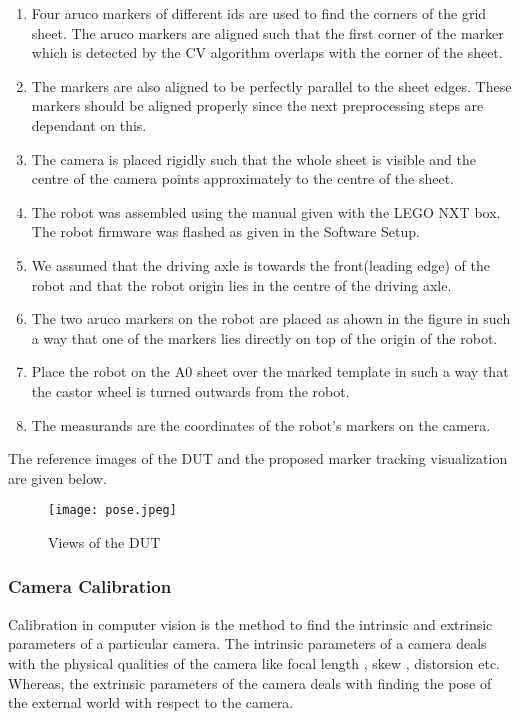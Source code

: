 \documentclass[10pt,a4paper]{article}
\begin{document}
\begin{enumerate}
	\item
	Four aruco markers of different ids are used to find the corners of the grid sheet. The aruco markers are aligned such that the first corner of the marker which is detected by the CV algorithm overlaps with the corner of the sheet.
	\item
	The markers are also aligned to be perfectly parallel to the sheet edges. These markers should be aligned properly since the next preprocessing steps are dependant on this.
	\item
	The camera is placed rigidly such that the whole sheet is visible and the centre of the camera points approximately to the centre of the sheet.	
    \item
    The robot was assembled using the manual given with the LEGO NXT box. The robot firmware was flashed as given in the Software Setup. 
    \item
    We assumed that the driving axle is towards the front(leading edge) of the robot and that the robot origin lies in the centre of the driving axle.
    \item
    The two aruco markers on the robot are placed as ahown in the figure in such a way that one of the markers lies directly on top of the origin of the robot.
    \item
    Place the robot on the A0 sheet over the marked template in such a way that the castor wheel is turned outwards from the robot.
    \item
	The measurands are the coordinates of the robot's markers on the camera.
    
\end{enumerate}
\vspace{0.5cm}

The reference images of the DUT and the proposed marker tracking visualization are given below.

\begin{figure}[h]
	\centering
\texttt{[image: pose.jpeg]}
\caption{ Views of the DUT}
\end{figure}

\subsubsection{Camera Calibration}


Calibration in computer vision is the method to find the intrinsic and extrinsic parameters of a particular camera. The intrinsic parameters of a camera deals with the physical qualities of the camera like focal length , skew , distorsion etc. Whereas, the extrinsic parameters of the camera deals with finding the pose of the external world with respect to the camera.\\
\end{document}
